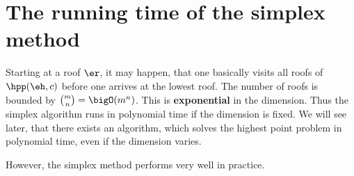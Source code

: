 \section{The running time of the simplex method}
\label{sec:running-time-simplex}


Starting at a roof $\er$, it may happen, that one basically visits
all roofs of $\hpp(\eh,c)$ before one arrives at the lowest
roof. The number of roofs is bounded by $\binom{m}{n} =
\bigO(m^n)$. This is {\bf exponential} in the dimension. Thus the
simplex algorithm runs in polynomial time if the dimension is
fixed. We will see later, that there exists an algorithm, which solves
the highest point problem in polynomial time, even if the dimension
varies. 

However, the simplex method performs very well in practice. 



